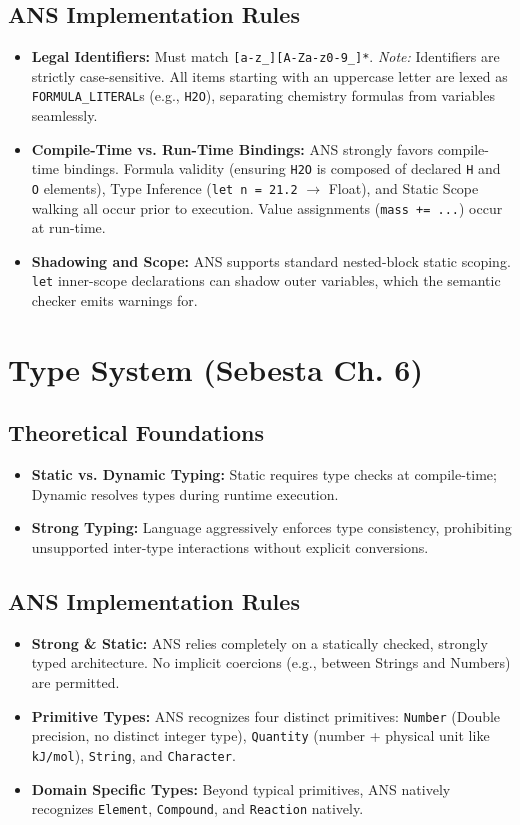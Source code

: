 \documentclass[11pt,a4paper]{article}
\newcommand{\code}[1]{\texttt{#1}}
\begin{document}
\subsection*{ANS Implementation Rules}
\begin{itemize}
    \item \textbf{Legal Identifiers:} Must match \code{[a-z\_][A-Za-z0-9\_]*}. \textit{Note:} Identifiers are strictly case-sensitive. All items starting with an uppercase letter are lexed as \code{FORMULA\_LITERAL}s (e.g., \code{H2O}), separating chemistry formulas from variables seamlessly.
    \item \textbf{Compile-Time vs. Run-Time Bindings:} ANS strongly favors compile-time bindings. Formula validity (ensuring \code{H2O} is composed of declared \code{H} and \code{O} elements), Type Inference (\code{let n = 21.2} $\rightarrow$ Float), and Static Scope walking all occur prior to execution. Value assignments (\code{mass += ...}) occur at run-time.
    \item \textbf{Shadowing and Scope:} ANS supports standard nested-block static scoping. \code{let} inner-scope declarations can shadow outer variables, which the semantic checker emits warnings for.
\end{itemize}

\section{Type System (Sebesta Ch. 6)}
\subsection*{Theoretical Foundations}
\begin{itemize}
    \item \textbf{Static vs. Dynamic Typing:} Static requires type checks at compile-time; Dynamic resolves types during runtime execution.
    \item \textbf{Strong Typing:} Language aggressively enforces type consistency, prohibiting unsupported inter-type interactions without explicit conversions.
\end{itemize}

\subsection*{ANS Implementation Rules}
\begin{itemize}
    \item \textbf{Strong \& Static:} ANS relies completely on a statically checked, strongly typed architecture. No implicit coercions (e.g., between Strings and Numbers) are permitted.
    \item \textbf{Primitive Types:} ANS recognizes four distinct primitives: \code{Number} (Double precision, no distinct integer type), \code{Quantity} (number + physical unit like \code{kJ/mol}), \code{String}, and \code{Character}.
    \item \textbf{Domain Specific Types:} Beyond typical primitives, ANS natively recognizes \code{Element}, \code{Compound}, and \code{Reaction} natively.
\end{itemize}
\end{document}
